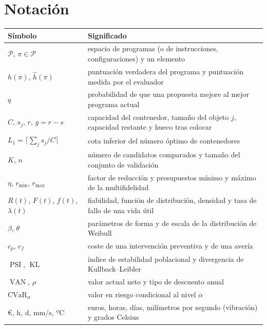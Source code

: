 \documentclass[11pt,a4paper,twoside,openany]{book}
\DeclareMathOperator{\VAN}{VAN}
\DeclareMathOperator{\PSI}{PSI}
\DeclareMathOperator{\KL}{KL}
\newcommand{\Prog}{\mathcal{P}}
\begin{document}
\section*{Notación}
\begin{center}\small
\begin{tabularx}{\textwidth}{@{}l>{\raggedright\arraybackslash}X@{}}
\toprule
Símbolo & Significado \\
\midrule
$\Prog$, $\pi\in\Prog$ & espacio de programas (o de instrucciones, configuraciones) y un elemento \\
$h(\pi)$, $\hat h(\pi)$ & puntuación verdadera del programa y puntuación medida por el evaluador \\
$q$ & probabilidad de que una propuesta mejore al mejor programa actual \\
$C$, $s_j$, $r$, $g=r-s$ & capacidad del contenedor, tamaño del objeto $j$, capacidad restante y hueco tras colocar \\
$L_1=\lceil\sum_j s_j/C\rceil$ & cota inferior del número óptimo de contenedores \\
$K$, $n$ & número de candidatos comparados y tamaño del conjunto de validación \\
$\eta$, $r_{\min}$, $r_{\max}$ & factor de reducción y presupuestos mínimo y máximo de la multifidelidad \\
$R(t)$, $F(t)$, $f(t)$, $\lambda(t)$ & fiabilidad, función de distribución, densidad y tasa de fallo de una vida útil \\
$\beta$, $\theta$ & parámetros de forma y de escala de la distribución de Weibull \\
$c_p$, $c_f$ & coste de una intervención preventiva y de una avería \\
$\PSI$, $\KL$ & índice de estabilidad poblacional y divergencia de Kullback--Leibler \\
$\VAN$, $\rho$ & valor actual neto y tipo de descuento anual \\
$\mathrm{CVaR}_\alpha$ & valor en riesgo condicional al nivel $\alpha$ \\
€, h, d, mm/s, ºC & euros, horas, días, milímetros por segundo (vibración) y grados Celsius \\
\bottomrule
\end{tabularx}
\end{center}


\tableofcontents

\mainmatter







\backmatter

\end{document}
